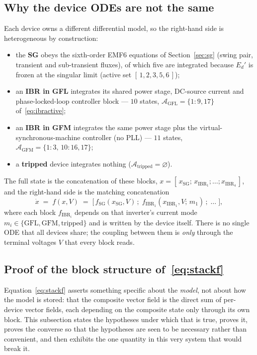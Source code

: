 \documentclass[12pt,a4paper]{article}
\theoremstyle{remark}
\begin{document}
\subsection{Why the device ODEs are not the same}\label{sec:ts-hetero}
Each device owns a different differential model, so the right-hand side is
heterogeneous by construction:
\begin{itemize}\itemsep2pt
  \item the \textbf{SG} obeys the sixth-order EMF6 equations of
        Section~\ref{sec:sg} (swing pair, transient and sub-transient fluxes),
        of which five are integrated because $E_d'$ is frozen at the
        singular limit (active set $[\,1,2,3,5,6\,]$);
  \item an \textbf{IBR in GFL} integrates its shared power stage, DC-source
        current and phase-locked-loop controller block --- $10$ states,
        $\mathcal{A}_{\mathrm{GFL}}=\{1{:}9,17\}$ of~\eqref{eq:ibractive};
  \item an \textbf{IBR in GFM} integrates the same power stage plus the
        virtual-synchronous-machine controller (no PLL) --- $11$ states,
        $\mathcal{A}_{\mathrm{GFM}}=\{1{:}3,\,10{:}16,17\}$;
  \item a \textbf{tripped} device integrates nothing
        ($\mathcal{A}_{\mathrm{tripped}}=\varnothing$).
\end{itemize}
The full state is the concatenation of these blocks,
$x=[\,x_{\mathrm{SG}};\,x_{\mathrm{IBR}_1};\dots;x_{\mathrm{IBR}_4}\,]$, and the
right-hand side is the matching concatenation
\begin{equation}
  \dot x \;=\; f(x,V)\;=\;
  \bigl[\,f_{\mathrm{SG}}(x_{\mathrm{SG}},V)\,;\;
          f_{\mathrm{IBR}_1}(x_{\mathrm{IBR}_1},V;\,m_1)\,;\;\dots\;\bigr],
  \label{eq:stackf}
\end{equation}
where each block $f_{\mathrm{IBR}_i}$ depends on that inverter's current mode
$m_i\in\{\mathrm{GFL},\mathrm{GFM},\mathrm{tripped}\}$ and is written by the
device itself. There is no single ODE that all devices share; the coupling
between them is \emph{only} through the terminal voltages $V$ that every block
reads.

\subsection{Proof of the block structure of~\eqref{eq:stackf}}\label{sec:ts-stackproof}
Equation~\eqref{eq:stackf} asserts something specific about the \emph{model}, not
about how the model is stored: that the composite vector field is the direct sum
of per-device vector fields, each depending on the composite state only through
its own block. This subsection states the hypotheses under which that is true,
proves it, proves the converse so that the hypotheses are seen to be necessary
rather than convenient, and then exhibits the one quantity in this very system
that would break it.
\end{document}
